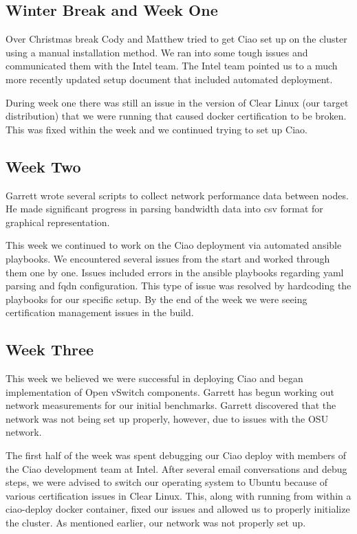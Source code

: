 \documentclass[10pt,onecolumn,journal,draftclsnofoot]{IEEEtran}
\begin{document}
\subsection{Winter Break and Week One}

Over Christmas break Cody and Matthew tried to get Ciao set up on the cluster
using a manual installation method. We ran into some tough issues and
communicated them with the Intel team. The Intel team pointed us to a much more
recently updated setup document that included automated deployment.

During week one there was still an issue in the version of Clear Linux (our
target distribution) that we were running that caused docker certification to be
broken. This was fixed within the week and we continued trying to set up Ciao.

\subsection{Week Two}

Garrett wrote several scripts to collect network performance data between nodes.
He made significant progress in parsing bandwidth data into csv format for
graphical representation.

This week we continued to work on the Ciao deployment via automated ansible
playbooks. We encountered several issues from the start and worked through
them one by one. Issues included errors in the ansible playbooks regarding yaml
parsing and fqdn configuration. This type of issue was resolved by hardcoding
the playbooks for our specific setup. By the end of the week we were seeing
certification management issues in the build.

\subsection{Week Three}

This week we believed we were successful in deploying Ciao and began
implementation of Open vSwitch components. Garrett has begun working out network
measurements for our initial benchmarks. Garrett discovered that the network was
not being set up properly, however, due to issues with the OSU network.

The first half of the week was spent debugging our Ciao deploy with members of
the Ciao development team at Intel. After several email conversations and debug
steps, we were advised to switch our operating system to Ubuntu because of
various certification issues in Clear Linux. This, along with running from
within a ciao-deploy docker container, fixed our issues and allowed us to
properly initialize the cluster. As mentioned earlier, our network was not
properly set up.
\end{document}
